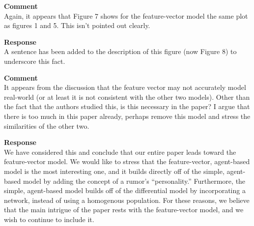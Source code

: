 \textbf{Comment } \\
Again, it appears that Figure 7 shows for the feature-vector model the same plot as figures 1 and 5. This isn't pointed out clearly.

\textbf{Response } \\
A sentence has been added to the description of this figure (now Figure 8) to underscore this fact.

\textbf{Comment } \\
It appears from the discussion that the feature vector may not accurately model real-world (or at least it is not consistent with the other two models).
Other than the fact that the authors studied this, is this necessary in the paper?
I argue that there is too much in this paper already, perhaps remove this model and stress the similarities of the other two.

\textbf{Response } \\
We have considered this and conclude that our entire paper leads toward the feature-vector model.
We would like to stress that the feature-vector, agent-based model is the most interesting one, and it builds directly off of the simple, agent-based model by adding the concept of a rumor's ``personality.''
Furthermore, the simple, agent-based model builds off of the differential model by incorporating a network, instead of using a homogenous population.
For these reasons, we believe that the main intrigue of the paper rests with the feature-vector model, and we wish to continue to include it.
